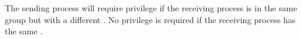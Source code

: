 \begin{appendix}
\begin{manroutinedescription}
      The sending process will require {} privilege if the
      receiving process is in the same group but with a different {}.
      No privilege is required if the receiving process has the same {}.

\end{manroutinedescription}

%


                 
\end{appendix}


